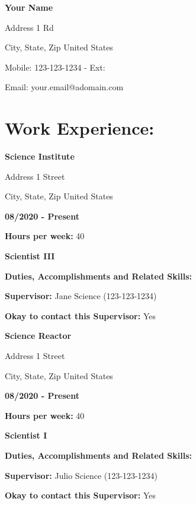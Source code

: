 \documentclass{usajobs}
\begin{document}
\hspace{0.2em}\textbf{Your Name}

Address 1 Rd

City, State, Zip United States

Mobile: 123-123-1234 - Ext:

Email: your.email@adomain.com

\section{Work Experience:}

\textbf{Science Institute}

Address 1 Street

City, State, Zip United States

\vspace{1em}

\textbf{08/2020 - Present}

\textbf{Hours per week:} 40

\textbf{Scientist III}

\textbf{Duties, Accomplishments and Related Skills:}

\lipsum[2]

\vspace{1em}

\lipsum[2]

\textbf{Supervisor:} Jane Science (123-123-1234)

\textbf{Okay to contact this Supervisor:} Yes

\noindent\rlap{\textcolor{rulegray}{\rule[0.3ex]{\textwidth}{.5mm}}}

\textbf{Science Reactor}

Address 1 Street

City, State, Zip United States

\vspace{1em}

\textbf{08/2020 - Present}

\textbf{Hours per week:} 40

\textbf{Scientist I}

\textbf{Duties, Accomplishments and Related Skills:}

\lipsum[2]

\vspace{1em}

\lipsum[2]

\textbf{Supervisor:} Julio Science (123-123-1234)

\textbf{Okay to contact this Supervisor:} Yes
\end{document}
